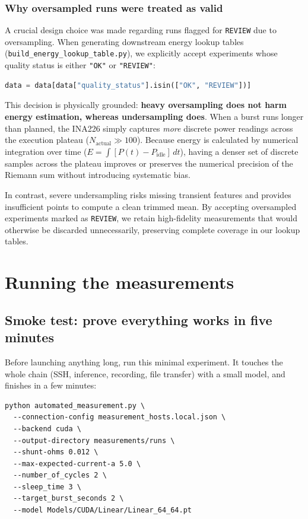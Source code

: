 \subsubsection{Why oversampled runs were treated as valid}
A crucial design choice was made regarding runs flagged for \texttt{REVIEW} due to oversampling. When generating downstream energy lookup tables (\texttt{build\_energy\_lookup\_table.py}), we explicitly accept experiments whose quality status is either \texttt{"OK"} or \texttt{"REVIEW"}:
\begin{lstlisting}[language=Python]
data = data[data["quality_status"].isin(["OK", "REVIEW"])]
\end{lstlisting}

This decision is physically grounded: \textbf{heavy oversampling does not harm energy estimation, whereas undersampling does}.
When a burst runs longer than planned, the INA226 simply captures \emph{more} discrete power readings across the execution plateau ($N_{\text{actual}} \gg 100$). Because energy is calculated by numerical integration over time ($E = \int [P(t) - P_{\text{idle}}]\,dt$), having a denser set of discrete samples across the plateau improves or preserves the numerical precision of the Riemann sum without introducing systematic bias. 

In contrast, severe undersampling risks missing transient features and provides insufficient points to compute a clean trimmed mean. By accepting oversampled experiments marked as \texttt{REVIEW}, we retain high-fidelity measurements that would otherwise be discarded unnecessarily, preserving complete coverage in our lookup tables.

\section{Running the measurements}

\subsection{Smoke test: prove everything works in five minutes}

Before launching anything long, run this minimal experiment. It touches the
whole chain (SSH, inference, recording, file transfer) with a small model,
and finishes in a few minutes:

\begin{lstlisting}
python automated_measurement.py \
  --connection-config measurement_hosts.local.json \
  --backend cuda \
  --output-directory measurements/runs \
  --shunt-ohms 0.012 \
  --max-expected-current-a 5.0 \
  --number_of_cycles 2 \
  --sleep_time 3 \
  --target_burst_seconds 2 \
  --model Models/CUDA/Linear/Linear_64_64.pt
\end{lstlisting}

